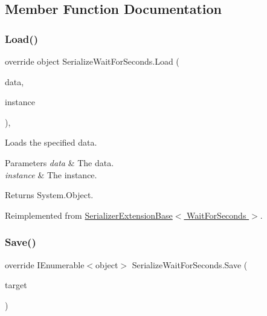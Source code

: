 \subsection{Member Function Documentation}
\mbox{\label{class_serialize_wait_for_seconds_a458c026ee7885ad2740dde5205b94eb7}} 
\subsubsection{\texorpdfstring{Load()}{Load()}}
{\footnotesize\ttfamily override object Serialize\+Wait\+For\+Seconds.\+Load (\begin{DoxyParamCaption}\item[{object \mbox{[}$\,$\mbox{]}}]{data,  }\item[{object}]{instance }\end{DoxyParamCaption})\hspace{0.3cm}{\ttfamily [inline]}, {\ttfamily [virtual]}}



Loads the specified data. 


\begin{DoxyParams}{Parameters}
{\em data} & The data.\\
\hline
{\em instance} & The instance.\\
\hline
\end{DoxyParams}
\begin{DoxyReturn}{Returns}
System.\+Object.
\end{DoxyReturn}


Reimplemented from \hyperlink{class_serializer_extension_base_a3792a9b27056e30ca0ac91531936ae47}{Serializer\+Extension\+Base$<$ Wait\+For\+Seconds $>$}.

\mbox{\label{class_serialize_wait_for_seconds_aa62dde11ef51cf1093957eb61841816e}} 
\subsubsection{\texorpdfstring{Save()}{Save()}}
{\footnotesize\ttfamily override I\+Enumerable$<$object$>$ Serialize\+Wait\+For\+Seconds.\+Save (\begin{DoxyParamCaption}\item[{Wait\+For\+Seconds}]{target }\end{DoxyParamCaption})\hspace{0.3cm}{\ttfamily [inline]}}



